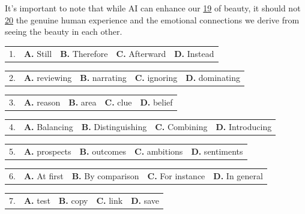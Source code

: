 \documentclass[UTF8,11pt]{ctexart}
\begin{document}
It’s important to note that while AI can enhance our \uline{19} of beauty, it should not \uline{20} the genuine human experience and the emotional connections we derive from seeing the beauty in each other.


\noindent\begin{tabularx}{\linewidth}{@{}lXXXX@{}}1. & \textbf{A.} Still & \textbf{B.} Therefore & \textbf{C.} Afterward & \textbf{D.} Instead\\\end{tabularx}\par

\noindent\begin{tabularx}{\linewidth}{@{}lXXXX@{}}2. & \textbf{A.} reviewing & \textbf{B.} narrating & \textbf{C.} ignoring & \textbf{D.} dominating\\\end{tabularx}\par

\noindent\begin{tabularx}{\linewidth}{@{}lXXXX@{}}3. & \textbf{A.} reason & \textbf{B.} area & \textbf{C.} clue & \textbf{D.} belief\\\end{tabularx}\par

\noindent\begin{tabularx}{\linewidth}{@{}lXXXX@{}}4. & \textbf{A.} Balancing & \textbf{B.} Distinguishing & \textbf{C.} Combining & \textbf{D.} Introducing\\\end{tabularx}\par

\noindent\begin{tabularx}{\linewidth}{@{}lXXXX@{}}5. & \textbf{A.} prospects & \textbf{B.} outcomes & \textbf{C.} ambitions & \textbf{D.} sentiments\\\end{tabularx}\par

\noindent\begin{tabularx}{\linewidth}{@{}lXXXX@{}}6. & \textbf{A.} At first & \textbf{B.} By comparison & \textbf{C.} For instance & \textbf{D.} In general\\\end{tabularx}\par

\noindent\begin{tabularx}{\linewidth}{@{}lXXXX@{}}7. & \textbf{A.} test & \textbf{B.} copy & \textbf{C.} link & \textbf{D.} save\\\end{tabularx}\par
\end{document}
